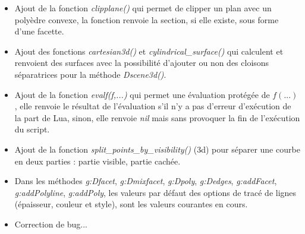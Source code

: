 \begin{itemize}
    \item Ajout de la fonction \emph{clipplane()} qui permet de clipper un plan avec un polyèdre convexe, la fonction renvoie la section, si elle existe, sous forme d'une facette.
    \item Ajout des fonctions \emph{cartesian3d()} et \emph{cylindrical\_surface()} qui calculent et renvoient des surfaces avec la possibilité d'ajouter ou non des cloisons séparatrices pour la méthode \emph{Dscene3d()}.
    \item Ajout de la fonction \emph{evalf(f,...)} qui permet une évaluation protégée de $f(...)$, elle renvoie le résultat de l'évaluation s'il n'y a pas d'erreur d'exécution de la part de Lua, sinon, elle renvoie \emph{nil} mais sans provoquer la fin de l'exécution du script.
    \item Ajout de la fonction \emph{split\_points\_by\_visibility()} (3d) pour séparer une courbe en deux parties : partie visible, partie cachée.
    \item Dans les méthodes \emph{g:Dfacet}, \emph{g:Dmixfacet}, \emph{g:Dpoly}, \emph{g:Dedges}, \emph{g:addFacet}, \emph{g:addPolyline}, \emph{g:addPoly}, les valeurs par défaut des options de tracé de lignes (épaisseur, couleur et style), sont les valeurs courantes en cours.
    \item Correction de bug...    
\end{itemize}

